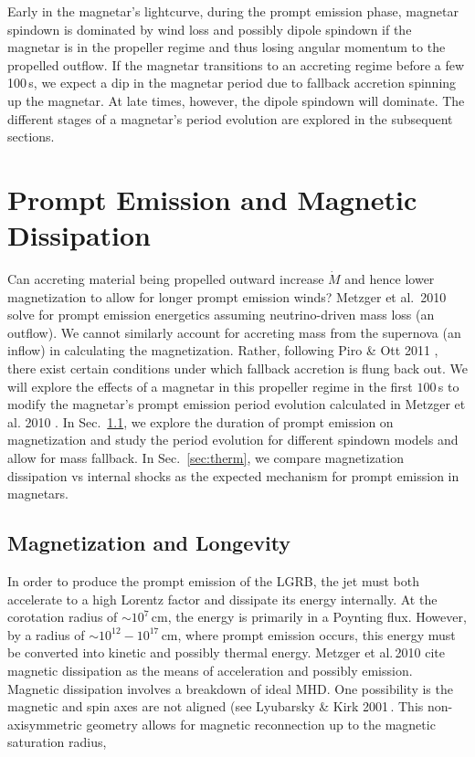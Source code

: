 \documentclass{article}
\begin{document}
Early in the magnetar's lightcurve, during the prompt emission phase, magnetar spindown is dominated by wind loss and possibly dipole spindown if the magnetar is in the propeller regime and thus losing angular momentum to the propelled outflow. If the magnetar transitions to an accreting regime before a few 100\,s, we expect a dip in the magnetar period due to fallback accretion spinning up the magnetar. At late times, however, the dipole spindown will dominate. The different stages of a magnetar's period evolution are explored in the subsequent sections.

\section{Prompt Emission and Magnetic Dissipation} \label{sec:prompt}
Can accreting material being propelled outward increase $\dot{M}$ and hence lower magnetization to allow for longer prompt emission winds?  Metzger et al.\ 2010 \cite{Metzger:2010pp} solve for prompt emission energetics assuming neutrino-driven mass loss (an outflow). We cannot similarly account for accreting mass from the supernova (an inflow) in calculating the magnetization. Rather, following Piro \& Ott 2011 \cite {Piro:2011ed}, there exist certain conditions under which fallback accretion is flung back out. We will explore the effects of a magnetar in this propeller regime in the first $100$\,s to modify the magnetar's prompt emission period evolution calculated in  Metzger et al. 2010 \cite{Metzger:2010pp}. In Sec.~\ref{sec:mag1}, we explore the duration of prompt emission on magnetization and study the period evolution for different spindown models and allow for mass fallback. In Sec.~\ref{sec:therm}, we compare magnetization dissipation vs internal shocks as the expected mechanism for prompt emission in magnetars.

\subsection{Magnetization and Longevity} \label{sec:mag1}

In order to produce the prompt emission of the LGRB, the jet must both accelerate to a high Lorentz factor and dissipate its energy internally. At the corotation radius of $\sim 10^7$\,cm, the energy is primarily in a Poynting flux. However, by a radius of $\sim 10^{12}- 10^{17}$\,cm, where prompt emission occurs, this energy must be converted into kinetic and possibly thermal energy.  Metzger et al.\,2010 \cite{Metzger:2010pp} cite  magnetic dissipation as the means of acceleration and possibly emission. Magnetic dissipation involves a breakdown of ideal MHD. One possibility is the magnetic and spin axes are not aligned (see Lyubarsky \& Kirk 2001\,\cite{Lyubarsky:2000yn}. This non-axisymmetric geometry allows for magnetic reconnection up to the magnetic saturation radius,
\end{document}

